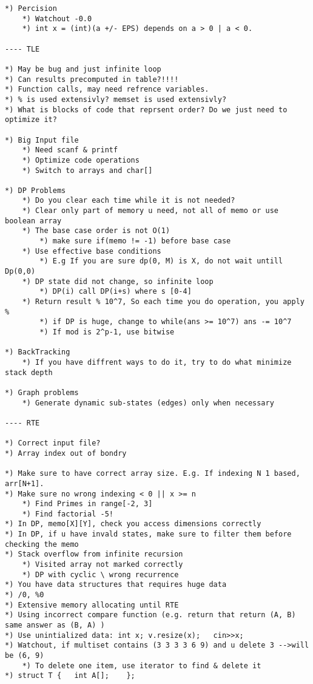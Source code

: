 \documentclass[12pt,a4paper,onesided]{article}
\begin{document}
\begin{multicols}{3}
\begin{lstlisting}
*) Percision
    *) Watchout -0.0
    *) int x = (int)(a +/- EPS) depends on a > 0 | a < 0.
		
---- TLE

*) May be bug and just infinite loop
*) Can results precomputed in table?!!!!
*) Function calls, may need refrence variables.
*) % is used extensivly? memset is used extensivly?
*) What is blocks of code that reprsent order? Do we just need to optimize it?
	
*) Big Input file
    *) Need scanf & printf
    *) Optimize code operations
    *) Switch to arrays and char[]	

*) DP Problems
    *) Do you clear each time while it is not needed?
    *) Clear only part of memory u need, not all of memo or use boolean array
    *) The base case order is not O(1)
        *) make sure if(memo != -1) before base case
    *) Use effective base conditions
        *) E.g If you are sure dp(0, M) is X, do not wait untill Dp(0,0)
    *) DP state did not change, so infinite loop
        *) DP(i) call DP(i+s) where s [0-4]
    *) Return result % 10^7, So each time you do operation, you apply %
        *) if DP is huge, change to while(ans >= 10^7) ans -= 10^7
        *) If mod is 2^p-1, use bitwise
				
*) BackTracking
    *) If you have diffrent ways to do it, try to do what minimize stack depth
    
*) Graph problems
    *) Generate dynamic sub-states (edges) only when necessary
		
---- RTE
		
*) Correct input file?
*) Array index out of bondry

*) Make sure to have correct array size. E.g. If indexing N 1 based, arr[N+1].
*) Make sure no wrong indexing < 0 || x >= n
    *) Find Primes in range[-2, 3]
    *) Find factorial -5!
*) In DP, memo[X][Y], check you access dimensions correctly
*) In DP, if u have invald states, make sure to filter them before checking the memo
*) Stack overflow from infinite recursion
    *) Visited array not marked correctly
    *) DP with cyclic \ wrong recurrence
*) You have data structures that requires huge data
*) /0, %0
*) Extensive memory allocating until RTE
*) Using incorrect compare function (e.g. return that return (A, B) same answer as (B, A) )
*) Use unintialized data: int x; v.resize(x);	cin>>x;
*) Watchout, if multiset contains (3 3 3 3 6 9) and u delete 3 -->will be (6, 9)
    *) To delete one item, use iterator to find & delete it
*) struct T {	int A[];	};
\end{lstlisting}


\end{multicols}
\end{document}
